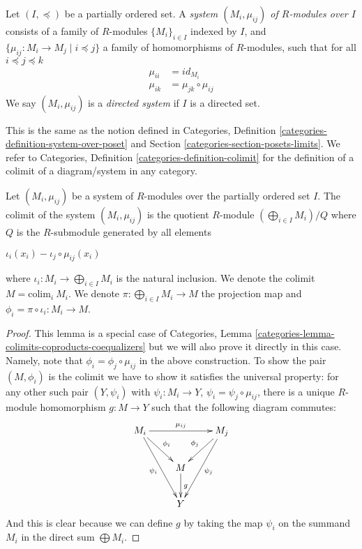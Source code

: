 \begin{definition}
\label{definition-directed-system}
Let $(I, \preceq)$ be a partially ordered set.
A {\it system $(M_i, \mu_{ij})$ of $R$-modules over $I$}
consists of a family of $R$-modules $\{M_i\}_{i\in I}$ indexed
by $I$, and $\{\mu_{ij} : M_i\rightarrow M_j \mid i\preceq j\}$
a family of homomorphisms of
$R$-modules, such that for all $i \preceq j \preceq k$
\begin{align}
\mu_{ii} &= id_{M_i}\\
\mu_{ik} &= \mu_{jk}\circ \mu_{ij}
\end{align}
We say $(M_i, \mu_{ij})$ is a {\it directed system} if $I$ is a directed set.
\end{definition}

\noindent
This is the same as the notion defined in Categories,
Definition \ref{categories-definition-system-over-poset}
and Section \ref{categories-section-posets-limits}.
We refer to Categories, Definition \ref{categories-definition-colimit}
for the definition of a colimit of a diagram/system in any
category.

\begin{lemma}
\label{lemma-colimit}
Let $(M_i, \mu_{ij})$ be a system of $R$-modules over the
partially ordered set $I$.
The colimit of the system $(M_i, \mu_{ij})$ is the quotient $R$-module
$(\bigoplus_{i\in I} M_i) /Q$ where $Q$ is the
$R$-submodule generated by all elements
\begin{center}
$\iota_{i}(x_i)-\iota_{j}\circ \mu_{ij}(x_i)$
\end{center}
where $\iota_{i} : M_i \rightarrow \bigoplus_{i\in I} M_i$
is the natural inclusion. We denote the colimit
$M = \text{colim}_i\ M_i$. We denote
$\pi : \bigoplus_{i\in I} M_i \rightarrow M$ the
projection map and
$\phi_{i} = \pi \circ \iota_{i} : M_i\rightarrow M$.
\end{lemma}

\begin{proof}
This lemma is a special case of
Categories, Lemma \ref{categories-lemma-colimits-coproducts-coequalizers}
but we will also prove it directly in this case.
Namely, note that $\phi_{i} = \phi_{j}\circ \mu_{ij}$ in the above
construction. To show the pair $(M, \phi_{i})$ is the colimit we have
to show it satisfies the universal property: for any other such pair
$(Y, \psi_{i})$ with $\psi_{i} : M_i\rightarrow
Y$, $\psi_{i} = \psi_{j}\circ \mu_{ij}$, there is a unique $R$-module
homomorphism $g : M\rightarrow Y$ such that the
following diagram commutes:
$$
\xymatrix{
M_i \ar[rr]^{\mu_{ij}} \ar[dr]^{\phi_{i}} \ar[ddr]_{\psi_{i}} & &
M_j\ar[dl]_{\phi_{j}} \ar[ddl]^{\psi_{j}} \\
& M \ar[d]^{g}\\
& Y
}
$$
And this is clear because we can define $g$ by taking the
map $\psi_i$ on the summand $M_i$ in the direct sum
$\bigoplus M_i$.
\end{proof}

